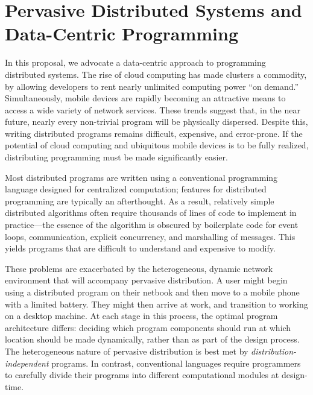 \section{Pervasive Distributed Systems and Data-Centric Programming}

In this proposal, we advocate a data-centric approach to programming
distributed systems. The rise of cloud computing has made clusters a
commodity, by allowing developers to rent nearly unlimited computing
power ``on demand.'' Simultaneously, mobile devices are rapidly
becoming an attractive means to access a wide variety of network
services. These trends suggest that, in the near future, nearly every
non-trivial program will be physically dispersed. Despite this,
writing distributed programs remains difficult, expensive, and
error-prone. If the potential of cloud computing and ubiquitous mobile
devices is to be fully realized, distributing programming must be made
significantly easier.

Most distributed programs are written using a conventional programming
language designed for centralized computation; features for
distributed programming are typically an afterthought. As a result,
relatively simple distributed algorithms often require thousands of
lines of code to implement in practice---the essence of the algorithm
is obscured by boilerplate code for event loops, communication,
explicit concurrency, and marshalling of messages. This yields
programs that are difficult to understand and expensive to modify.

These problems are exacerbated by the heterogeneous, dynamic network environment
that will accompany pervasive distribution. A user might begin using a
distributed program on their netbook and then move to a mobile phone with a
limited battery. They might then arrive at work, and transition to working on a
desktop machine. At each stage in this process, the optimal program architecture
differs: deciding which program components should run at which location should
be made dynamically, rather than as part of the design process. The
heterogeneous nature of pervasive distribution is best met by
\emph{distribution-independent} programs. In contrast, conventional languages
require programmers to carefully divide their programs into different
computational modules at design-time.
